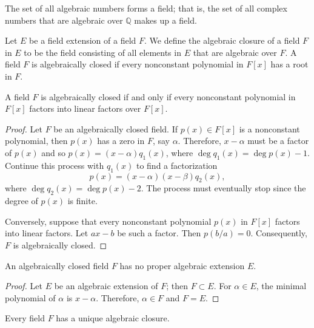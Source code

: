  
\begin{corollary}\label{fields:algebraics_field_corollary}
The set of all algebraic numbers forms a field; that is, the set of all
complex numbers that are algebraic over ${\mathbb Q}$ makes up a field.
\end{corollary}
 

Let $E$ be a field extension of a field $F$. We define the {\bfi
algebraic closure\/}  of a field $F$ in $E$ to
be the field consisting of all elements in $E$ that are algebraic over
$F$. A field $F$ is {\bfi algebraically
closed\/} if every nonconstant
polynomial in  $F[x]$ has a root in $F$. 

 
\begin{theorem}
A field $F$ is algebraically closed if and only if every nonconstant
polynomial in $F[x]$ factors into linear factors over $F[x]$.
\end{theorem}
 
 
\begin{proof}
Let $F$ be an algebraically closed field. If $p(x) \in F[x]$ is a
nonconstant polynomial, then $p(x)$ has a zero in $F$, say $\alpha$.
Therefore, $x-\alpha$ must be a factor of $p(x)$ and so $p(x) = (x-
\alpha) q_1(x)$, where $\deg q_1(x) = \deg p(x) - 1$. Continue this
process with $q_1(x)$ to find a factorization
\[
p(x)=(x-\alpha)(x-\beta)q_2(x),
\]
where $\deg q_2(x) = \deg p(x) -2$. The process must eventually stop
since the degree of $p(x)$ is finite.  
 

Conversely, suppose that every nonconstant polynomial $p(x)$ in $F[x]$ 
factors into linear factors. Let $ax-b$ be such a factor.
Then $p( b/a) = 0$. Consequently, $F$ is algebraically closed.
\end{proof}
 
 
\begin{corollary}
An algebraically closed field $F$ has no proper algebraic extension
$E$. 
\end{corollary}
 

\begin{proof}
Let $E$ be an algebraic extension of $F$; then $F \subset E$. For $\alpha
\in E$, the minimal polynomial of $\alpha$ is $x - \alpha$. Therefore, 
$\alpha \in F$ and $F=E$. 
\end{proof}


\begin{theorem}
Every field $F$ has a unique algebraic closure.
\end{theorem}


